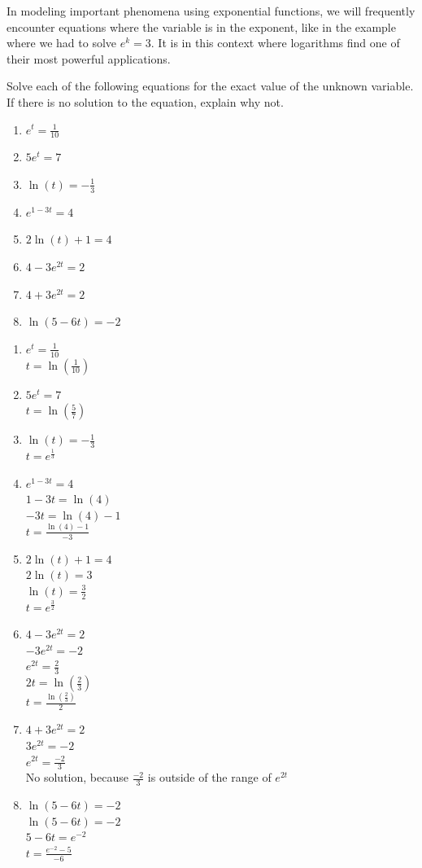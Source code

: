 \documentclass[nooutcomes]{ximera}
\begin{document}
In modeling important phenomena using exponential functions, we will frequently encounter equations where the variable is in the exponent, like in the example where we had to solve \(e^k = 3\).  It is in this context where logarithms find one of their most powerful applications.  
\begin{example}
Solve each of the following equations for the exact value of the unknown variable.  If there is no solution to the equation, explain why not.%

\begin{enumerate}[label=\alph*.]
\item
\(e^t = \frac{1}{10}\)%
\item
\(5e^{t}=7\)%
\item
\(\ln(t) = -\frac{1}{3}\)%
\item
\(e^{1-3t} = 4\)%
\item
\(2\ln(t) + 1 = 4\)%
\item
\(4 - 3e^{2t} = 2\)%
\item
\(4 + 3e^{2t} = 2\)%
\item
\(\ln(5 - 6t) = -2\)%
\end{enumerate}
\begin{explanation}
\begin{enumerate}[label=\alph*.]
\item
\(e^t = \frac{1}{10}\)\\
$t=\ln{\left(\frac{1}{10}\right)}$
\item
\(5e^{t}=7\)\\
$t=\ln{\left(\frac{5}{7}\right)}$
\item
\(\ln(t) = -\frac{1}{3}\)\\
$t=e^{\frac{1}{3}}$
\item
\(e^{1-3t} = 4\)\\
$1-3t = \ln(4)$\\
$-3t = \ln(4)-1$\\
$t = \frac{\ln(4)-1}{-3}$
\item
\(2\ln(t) + 1 = 4\)\\
$2\ln(t) = 3$\\
$\ln(t) = \frac{3}{2}$\\
$t = e^{\frac{3}{2}}$
\item
\(4 - 3e^{2t} = 2\)\\
$-3e^{2t} = -2$\\
$e^{2t} = \frac{2}{3}$\\
$2t = \ln\left({\frac{2}{3}}\right)$\\
$t = \frac{\ln\left({\frac{2}{3}}\right)}{2}$
\item
\(4 + 3e^{2t} = 2\)\\
$3e^{2t} = -2$\\
$e^{2t} = \frac{-2}{3}$\\
No solution, because $\frac{-2}{3}$ is outside of the range of $e^{2t}$
\item
\(\ln(5 - 6t) = -2\)\\
$\ln(5 - 6t) = -2$\\
$5-6t=e^{-2}$\\
$t=\frac{e^{-2}-5}{-6}$
\end{enumerate}
\end{explanation}
%
\end{example}
\end{document}
